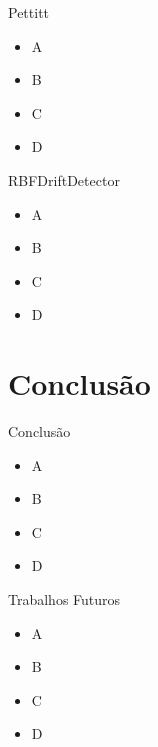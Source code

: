 \documentclass[10pt]{beamer}
\newcommand{\themename}{\textbf{\textsc{metropolis}}\xspace}
\begin{document}
\begin{frame}{Pettitt}
    \begin{itemize}
        \item<1 -> A
        \item<2 -> B
        \item<3 -> C
        \item<4 -> D
      \end{itemize}
\end{frame}

\begin{frame}{RBFDriftDetector}
    \begin{itemize}
        \item<1 -> A
        \item<2 -> B
        \item<3 -> C
        \item<4 -> D
      \end{itemize}
\end{frame}

\section{Conclusão}

\begin{frame}{Conclusão}
    \begin{itemize}
        \item<1 -> A
        \item<2 -> B
        \item<3 -> C
        \item<4 -> D
      \end{itemize}
\end{frame}

\begin{frame}{Trabalhos Futuros}
    \begin{itemize}
        \item<1 -> A
        \item<2 -> B
        \item<3 -> C
        \item<4 -> D
      \end{itemize}
\end{frame}


\end{document}
